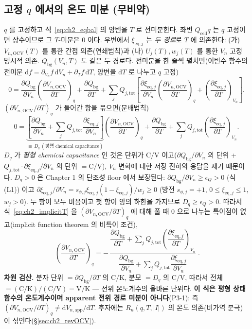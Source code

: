 \documentclass[11pt,a4paper]{article}
\newcommand{\dd}{\mathrm{d}}
\newcommand{\eq}{\mathrm{eq}}
\newcommand{\app}{\mathrm{app}}
\newcommand{\bg}{\mathrm{bg}}
\newcommand{\cell}{\mathrm{cell}}
\newcommand{\OCV}{\mathrm{OCV}}
\newcommand{\tot}{\mathrm{tot}}
\begin{document}
\subsection{고정 $q$ 에서의 온도 미분 (무비약)}\label{sec:ch2_ocvT_fix}
$q$ 를 고정하고 식~\eqref{eq:ch2_eqbal} 의 양변을 $T$ 로 전미분한다. 좌변 $Q_\cell q$ 는 $q$ 고정이면 상수이므로
그 $T$-미분은 $0$ 이다. 우변에서 $\xi_{\eq,j}$ 는 \emph{두 경로}로 $T$ 에 의존한다: (가) $V_{n,\OCV}(T)$ 를 통한
간접 의존(연쇄법칙)과 (나) $U_j(T),w_j(T)$ 를 통한 $V_n$ 고정 명시적 의존. $Q_\bg(V_n,T)$ 도 같은 두 경로다.
전미분을 한 줄씩 펼치면(이변수 함수의 전미분 $\dd f=\partial_{V_n}f\,\dd V_n+\partial_T f\,\dd T$, 양변을 $\dd T$
로 나누고 $q$ 고정)
\begin{equation}
0=\frac{\partial Q_\bg}{\partial V_n}\left(\frac{\partial V_{n,\OCV}}{\partial T}\right)_q+\frac{\partial Q_\bg}{\partial T}
+\sum_{j}Q_{j,\tot}\!\left[\frac{\partial\xi_{\eq,j}}{\partial V_n}\left(\frac{\partial V_{n,\OCV}}{\partial T}\right)_q
+\left(\frac{\partial\xi_{\eq,j}}{\partial T}\right)_{V_n}\right].
\label{eq:ch2_implicitT_raw}
\end{equation}
$(\partial V_{n,\OCV}/\partial T)_q$ 가 들어간 항을 묶으면(분배법칙)
\begin{equation}
0=\underbrace{\left[\frac{\partial Q_\bg}{\partial V_n}+\sum_{j}Q_{j,\tot}\frac{\partial\xi_{\eq,j}}{\partial V_n}\right]}_{\equiv\,D_q\ (\text{평형 chemical capacitance})}
\left(\frac{\partial V_{n,\OCV}}{\partial T}\right)_q
+\frac{\partial Q_\bg}{\partial T}+\sum_{j}Q_{j,\tot}\left(\frac{\partial\xi_{\eq,j}}{\partial T}\right)_{V_n}.
\label{eq:ch2_implicitT}
\end{equation}
$D_q$ 가 \emph{평형 chemical capacitance} 인 것은 단위가 $\mathrm{C/V}$ 이고($\partial Q_\bg/\partial V_n$ 의
단위 + $Q_{j,\tot}\cdot\partial\xi_{\eq,j}/\partial V_n$ 의 단위 $=\mathrm C/\mathrm V$), $V_n$ 변화에 대한
저장 전하의 응답을 재기 때문이다. $D_q>0$ 은 Chapter 1 의 단조성 floor 에서 보장된다: $\partial Q_\bg/\partial V_n\ge\epsilon_Q>0$
(식 (L1)) 이고 $\partial\xi_{\eq,j}/\partial V_n=s_{\phi,j}\xi_{\eq,j}(1-\xi_{\eq,j})/w_j\ge0$ (방전
$s_{\phi,j}=+1$, $0\le\xi_{\eq,j}\le1$, $w_j>0$). 두 항이 모두 비음이고 첫 항이 양의 하한을 가지므로 $D_q\ge\epsilon_Q>0$.
따라서 식~\eqref{eq:ch2_implicitT} 을 $(\partial V_{n,\OCV}/\partial T)_q$ 에 대해 풀 때 $0$ 으로 나누는 특이점이
없고(implicit function theorem 의 비특이 조건),
\begin{equation}
\boxed{\;\left(\frac{\partial V_{n,\OCV}}{\partial T}\right)_q
=-\,\frac{\dfrac{\partial Q_\bg}{\partial T}+\displaystyle\sum_{j}Q_{j,\tot}\left(\dfrac{\partial\xi_{\eq,j}}{\partial T}\right)_{V_n}}
{\dfrac{\partial Q_\bg}{\partial V_n}+\displaystyle\sum_{j}Q_{j,\tot}\dfrac{\partial\xi_{\eq,j}}{\partial V_n}}\;.}
\label{eq:ch2_dVocvdT}
\end{equation}
\textbf{차원 검산.} 분자 단위 $=\partial Q_\bg/\partial T$ 의 $\mathrm{C/K}$, 분모 $=D_q$ 의 $\mathrm{C/V}$,
따라서 전체 $=(\mathrm{C/K})/(\mathrm{C/V})=\mathrm{V/K}$ — 전위 온도계수의 올바른 단위다. \textbf{이 식은 평형
상태함수의 온도계수이며 apparent 전위 경로 미분이 아니다}(P3-1): 즉 $(\partial V_{n,\OCV}/\partial T)_q\ne
\dd V_{n,\app}/\dd T$. 후자에는 $R_n(q,T,|I|)$ 의 온도 의존(비가역 분극)이 섞인다(\S\ref{sec:ch2_revOCV}).
\end{document}
